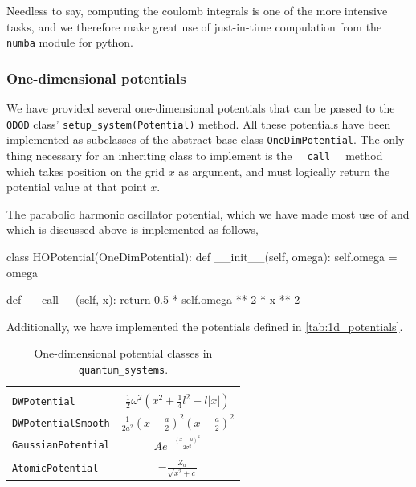 Needless to say, computing the coulomb integrals is one of the more intensive tasks,
and we therefore make great use of just-in-time compulation from the \lstinline{numba} 
module for python.



\subsubsection{One-dimensional potentials}
\label{sec:1d_potentials}

We have provided several one-dimensional potentials that can be passed to 
the \lstinline{ODQD} class' \lstinline{setup_system(Potential)} method.
All these potentials have been implemented as subclasses of the abstract 
base class \lstinline{OneDimPotential}. The only thing necessary for an 
inheriting class to implement is the \lstinline{__call__} method which 
takes position on the grid $x$ as argument, and must logically return 
the potential value at that point $x$.

The parabolic harmonic oscillator potential,
which we have made most use of and which is 
discussed above is implemented as follows,
\begin{python}
class HOPotential(OneDimPotential):
    def __init__(self, omega):
        self.omega = omega

    def __call__(self, x):
        return 0.5 * self.omega ** 2 * x ** 2
\end{python}

Additionally, we have implemented the potentials defined in \autoref{tab:1d_potentials}.

\begin{table}
    \caption{One-dimensional potential classes in \lstinline{quantum_systems}.}
    \centering
    \begin{tabular}{l c}
        \\
        \hline\hline \\ 
        \lstinline[]$DWPotential$         & 
        $\frac{1}{2}\omega^2\left(x^2 + \frac{1}{4}l^2 - l|x| \right)$ \\ [1em]
        \lstinline[]$DWPotentialSmooth$   &
        $\frac{1}{2a^2}\left(x + \frac{a}{2}\right)^2\left(x - \frac{a}{2}\right)^2$ \\ [1em]
        \lstinline[]$GaussianPotential$   &
        $Ae^{-\frac{(x-\mu)^2}{2\sigma^2}}$ \\ [1em]
        \lstinline[]$AtomicPotential$     &
        $- \frac{Z_a}{\sqrt{x^2 + c}}$ \\ [1em] \hline\hline
    \end{tabular} 
    \label{tab:1d_potentials}
\end{table}

